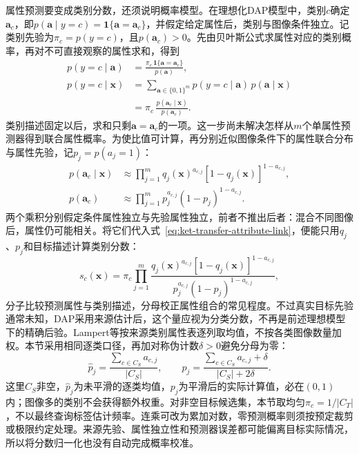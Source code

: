 属性预测要变成类别分数，还须说明概率模型。在理想化DAP模型中，类别$c$确定$\bm a_c$，即$p(\bm a\mid y=c)=\mathbf1\{\bm a=\bm a_c\}$，并假定给定属性后，类别与图像条件独立。记类别先验为$\pi_c=p(y=c)$，且$p(\bm a_c)>0$。先由贝叶斯公式求属性对应的类别概率，再对不可直接观察的属性求和，得到
\begin{equation}
  \begin{aligned}
    p(y=c\mid\bm a)
      &=\frac{\pi_c\,\mathbf 1\{\bm a=\bm a_c\}}{p(\bm a)},\\
    p(y=c\mid\bm x)
      &=\sum_{\bm a\in\{0,1\}^m}
          p(y=c\mid\bm a)\,p(\bm a\mid\bm x)\\
      &=\pi_c\,\frac{p(\bm a_c\mid\bm x)}{p(\bm a_c)}.
  \end{aligned}
  \label{eq:ket-transfer-attribute-link}
\end{equation}
类别描述固定以后，求和只剩$\bm a=\bm a_c$的一项。这一步尚未解决怎样从$m$个单属性预测器得到联合属性概率。为使比值可计算，再分别近似图像条件下的属性联合分布与属性先验，记$p_j=p(a_j=1)$：
\[
  \begin{aligned}
    p(\bm a_c\mid\bm x)
      &\approx\prod_{j=1}^{m}
        q_j(\bm x)^{a_{c,j}}[1-q_j(\bm x)]^{1-a_{c,j}},\\
    p(\bm a_c)
      &\approx\prod_{j=1}^{m}
        p_j^{a_{c,j}}(1-p_j)^{1-a_{c,j}}.
  \end{aligned}
\]
两个乘积分别假定条件属性独立与先验属性独立，前者不推出后者：混合不同图像后，属性仍可能相关。将它们代入式~\eqref{eq:ket-transfer-attribute-link}，便能只用$q_j$、$p_j$和目标描述计算类别分数：
\begin{equation}
  s_c(\bm x)=\pi_c
  \prod_{j=1}^{m}
  \frac{q_j(\bm x)^{a_{c,j}}
        [1-q_j(\bm x)]^{1-a_{c,j}}}
       {p_j^{a_{c,j}}(1-p_j)^{1-a_{c,j}}},
  \label{eq:ket-transfer-attribute-score}
\end{equation}
分子比较预测属性与类别描述，分母校正属性组合的常见程度。不过真实目标先验通常未知，DAP采用来源估计后，这个量应视为分类分数，不再是前述理想模型下的精确后验。Lampert等按来源类别属性表逐列取均值，不按各类图像数量加权。本节采用相同逐类口径，再加对称伪计数$\delta>0$避免分母为零：
\[
  \hat p_j=\frac{\sum_{c\in C_S}a_{c,j}}{|C_S|},
  \qquad
  p_j=\frac{\sum_{c\in C_S}a_{c,j}+\delta}{|C_S|+2\delta}.
\]
这里$C_S$非空，$\hat p_j$为未平滑的逐类均值，$p_j$为平滑后的实际计算值，必在$(0,1)$内；图像多的类别不会获得额外权重。对非空目标候选集，本节取均匀$\pi_c=1/|C_T|$，不以最终查询标签估计频率。连乘可改为累加对数，零预测概率则须按预定裁剪或极限约定处理。来源先验、属性独立性和预测器误差都可能偏离目标实际情况，所以将分数归一化也没有自动完成概率校准。


